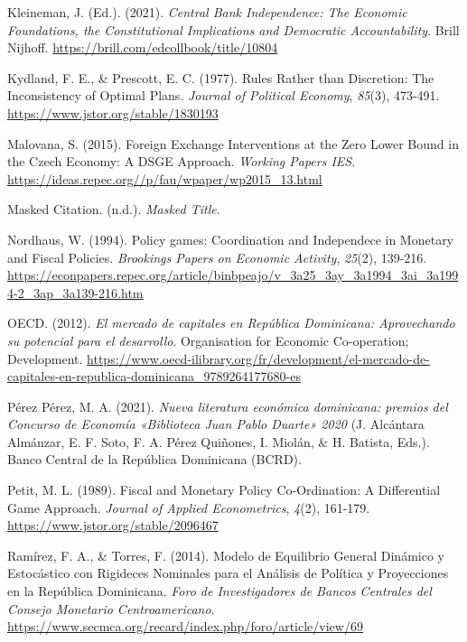 \documentclass[
  man,
  longtable,
  nolmodern,
  notxfonts,
  notimes,
  colorlinks=true,linkcolor=blue,citecolor=blue,urlcolor=blue]{apa7}
\newlength{\cslhangindent}
\newenvironment{CSLReferences}[2] %
 {\begin{list}{}{%
  \setlength{\itemindent}{0pt}
  \setlength{\leftmargin}{0pt}
  \setlength{\parsep}{0pt}
  \ifodd #1
   \setlength{\leftmargin}{\cslhangindent}
   \setlength{\itemindent}{-1\cslhangindent}
  \fi
  \setlength{\itemsep}{#2\baselineskip}}}
 {\end{list}}
\begin{document}
\begin{CSLReferences}{1}{0}
Kleineman, J. (Ed.). (2021). \emph{Central Bank Independence: The
Economic Foundations, the Constitutional Implications and Democratic
Accountability}. Brill Nijhoff.
\url{https://brill.com/edcollbook/title/10804}

Kydland, F. E., \& Prescott, E. C. (1977). Rules Rather than Discretion:
The Inconsistency of Optimal Plans. \emph{Journal of Political Economy},
\emph{85}(3), 473-491. \url{https://www.jstor.org/stable/1830193}

Malovana, S. (2015). Foreign Exchange Interventions at the Zero Lower
Bound in the Czech Economy: A {DSGE} Approach. \emph{Working Papers
{IES}}. \url{https://ideas.repec.org//p/fau/wpaper/wp2015_13.html}

Masked Citation. (n.d.). \emph{Masked Title}.

Nordhaus, W. (1994). Policy games: Coordination and Independece in
Monetary and Fiscal Policies. \emph{Brookings Papers on Economic
Activity}, \emph{25}(2), 139-216.
\url{https://econpapers.repec.org/article/binbpeajo/v_3a25_3ay_3a1994_3ai_3a1994-2_3ap_3a139-216.htm}

OECD. (2012). \emph{El mercado de capitales en República Dominicana:
Aprovechando su potencial para el desarrollo}. Organisation for Economic
Co-operation; Development.
\url{https://www.oecd-ilibrary.org/fr/development/el-mercado-de-capitales-en-republica-dominicana_9789264177680-es}

Pérez Pérez, M. A. (2021). \emph{Nueva literatura económica dominicana:
premios del Concurso de Economía «Biblioteca Juan Pablo Duarte» 2020}
(J. Alcántara Almánzar, E. F. Soto, F. A. Pérez Quiñones, I. Miolán, \&
H. Batista, Eds.). Banco Central de la República Dominicana ({BCRD}).

Petit, M. L. (1989). Fiscal and Monetary Policy Co-Ordination: A
Differential Game Approach. \emph{Journal of Applied Econometrics},
\emph{4}(2), 161-179. \url{https://www.jstor.org/stable/2096467}

Ramírez, F. A., \& Torres, F. (2014). Modelo de Equilibrio General
Dinámico y Estocástico con Rigideces Nominales para el Análisis de
Política y Proyecciones en la República Dominicana. \emph{Foro de
Investigadores de Bancos Centrales del Consejo Monetario
Centroamericano}.
\url{https://www.secmca.org/recard/index.php/foro/article/view/69}


\end{CSLReferences}
\end{document}
